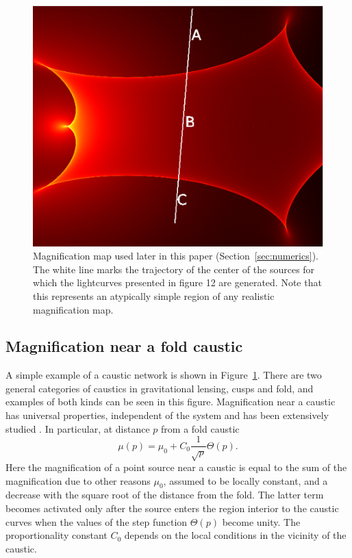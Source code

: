 \documentclass[usenatbib]{mn2e}
\begin{document}
\begin{figure}
\centering
\includegraphics[width=0.9\hsize]{figures/IRIS567_path.eps}
\caption{\label{fig:magnification_map} Magnification map used later in
  this paper (Section~\ref{sec:numerics}). The white line marks the
  trajectory of the center of the sources for which the lightcurves
  presented in figure 12 are generated.  Note that this represents an
  atypically simple region of any realistic magnification map.}
\end{figure}


\subsection{Magnification near a fold caustic}

A simple example of a caustic network is shown in
Figure~\ref{fig:magnification_map}.  There are two general categories
of caustics in gravitational lensing, cusps and fold, and examples of
both kinds can be seen in this figure.  Magnification near a caustic
has universal properties, independent of the system and has been
extensively studied
\citep{1986ApJ...310..568B,1992A&A...260....1S,2002ApJ...574..970G,2002ApJ...580..468G}.
In particular, at distance $p$ from a fold caustic
\begin {equation}
 \mu(p) = \mu_0 + C_0 \frac{1}{\sqrt{p}} \Theta(p).
\end {equation}
Here the magnification of a point source near a caustic is equal to
the sum of the magnification due to other reasons $\mu_0$, assumed to
be locally constant, and a decrease with the square root of the
distance from the fold. The latter term becomes activated only after
the source enters the region interior to the caustic curves when the
values of the step function $\Theta(p)$ become unity. The
proportionality constant $C_0$ depends on the local conditions in the
vicinity of the caustic.
\end{document}
